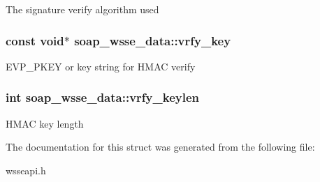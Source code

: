 \label{structsoap__wsse__data_a0d9a91454240aedf7f709e890719c3f2}
The signature verify algorithm used \hypertarget{structsoap__wsse__data_a04590479dd85a245d09c74c603df82c3}{
\subsubsection[{vrfy\_\-key}]{\setlength{\rightskip}{0pt plus 5cm}const void$\ast$ {\bf soap\_\-wsse\_\-data::vrfy\_\-key}}}
\label{structsoap__wsse__data_a04590479dd85a245d09c74c603df82c3}
EVP\_\-PKEY or key string for HMAC verify \hypertarget{structsoap__wsse__data_ab0f9414e23e38f719df0fe0e47bbb645}{
\subsubsection[{vrfy\_\-keylen}]{\setlength{\rightskip}{0pt plus 5cm}int {\bf soap\_\-wsse\_\-data::vrfy\_\-keylen}}}
\label{structsoap__wsse__data_ab0f9414e23e38f719df0fe0e47bbb645}
HMAC key length 

The documentation for this struct was generated from the following file:\begin{DoxyCompactItemize}
\item 
wsseapi.h\end{DoxyCompactItemize}
